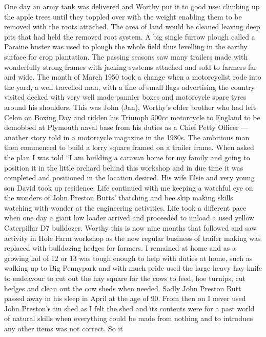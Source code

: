 
One day an army tank was delivered and Worthy put it to good use: climbing up
the apple trees until they toppled over with the weight enabling them to be
removed with the roots attached.  The area of land would be cleaned leaving
deep pits that had held the removed root system. A big single furrow plough
called a Paraine buster was used to plough the whole field thus levelling in
the earthy surface for crop plantation.  The passing seasons saw many trailers
made with wonderfully strong frames with jacking systems attached and sold to
farmers far and wide. The month of March 1950 took a change when a motorcyclist
rode into the yard, a well travelled man, with a line of small flags
advertising the country visited decked with very well made pannier        boxes
and motorcycle spare tyres around his shoulders.  This was John (Jan), Worthy's
older brother who had left Celon on Boxing Day and ridden his Triumph 500cc
motorcycle to England to be demobbed at Plymouth naval base from his duties as
a Chief Petty Officer --- another story told in a motorcycle magazine in the
1980s.  The ambitious man then commenced to build a lorry square framed on a
trailer frame.  When asked the plan I was told ``I am building a caravan home
for my family and going to position it in the little orchard behind this
workshop and in due time it was completed and positioned in the location
desired.  His wife Elsie and very young son David took up residence. Life
continued with me keeping a watchful eye on the wonders of John Preston Butts'
thatching and bee skip making skills watching with wonder at the engineering
activities.  Life took a different pace when one day a giant low loader arrived
and proceeded to unload a used yellow Caterpillar D7 bulldozer.  Worthy this is
now nine months that followed and saw activity in Hole Farm workshop as the new
regular business of trailer making was replaced with bulldozing hedges for
farmers. I remained at home and as a growing lad of 12 or 13 was tough enough
to help with duties at home, such as walking up to Big Pennypark and with much
pride used the large heavy hay knife to endeavour to cut out the hay square for
the cows to feed, hoe turnips, cut hedges and clean out the cow sheds when
needed.  Sadly John Preston Butt passed away in his sleep in April at the age
of 90.  From then on I never used John Preston's tin shed as I felt the shed
and its contents were for a past world of natural skills when everything could
be made from nothing and to introduce any other items was not correct.  So it
